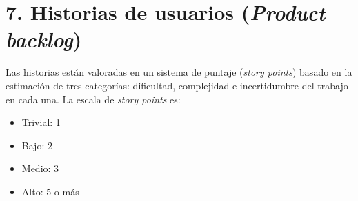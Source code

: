 \documentclass[
11pt, %
codirector, %
]{charter}
\begin{document}
\section{7. Historias de usuarios (\textit{Product backlog})}
\label{sec:backlog}

Las historias están valoradas en un sistema de puntaje (\textit{story points}) basado en la estimación de tres categorías: dificultad, complejidad e incertidumbre del trabajo en cada una. La escala de \textit{story points} es:

\begin{itemize}
\item Trivial: 1
\item Bajo: 2
\item Medio: 3
\item Alto: 5 o más
\end{itemize}
\end{document}
